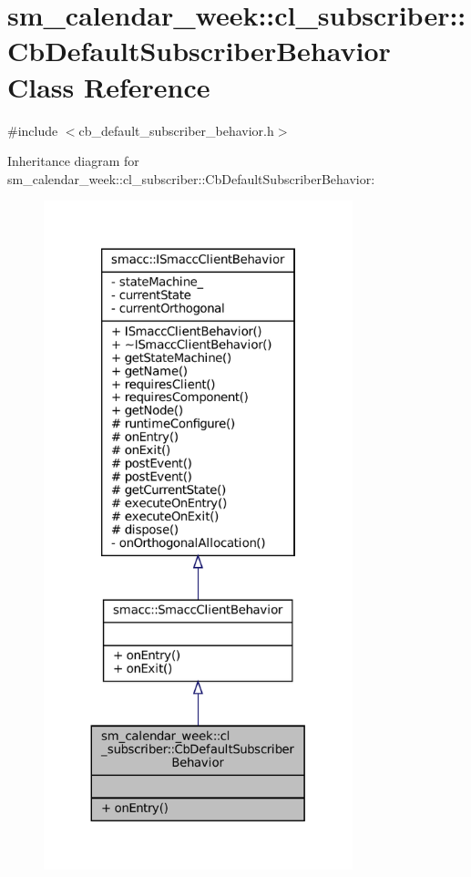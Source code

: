 \hypertarget{classsm__calendar__week_1_1cl__subscriber_1_1CbDefaultSubscriberBehavior}{}\section{sm\+\_\+calendar\+\_\+week\+:\+:cl\+\_\+subscriber\+:\+:Cb\+Default\+Subscriber\+Behavior Class Reference}
\label{classsm__calendar__week_1_1cl__subscriber_1_1CbDefaultSubscriberBehavior}


{\ttfamily \#include $<$cb\+\_\+default\+\_\+subscriber\+\_\+behavior.\+h$>$}



Inheritance diagram for sm\+\_\+calendar\+\_\+week\+:\+:cl\+\_\+subscriber\+:\+:Cb\+Default\+Subscriber\+Behavior\+:
\nopagebreak
\begin{figure}[H]
\begin{center}
\leavevmode
\includegraphics[height=550pt]{classsm__calendar__week_1_1cl__subscriber_1_1CbDefaultSubscriberBehavior__inherit__graph}
\end{center}
\end{figure}


